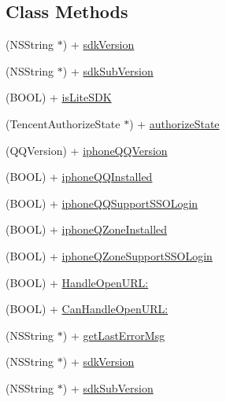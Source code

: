 \subsection*{Class Methods}
\begin{DoxyCompactItemize}
\item 
(N\+S\+String $\ast$) + \mbox{\hyperlink{interface_tencent_o_auth_af681e3d298b7a654741188082dcddf6d}{sdk\+Version}}
\item 
(N\+S\+String $\ast$) + \mbox{\hyperlink{interface_tencent_o_auth_afaf66587ebebdff3de626fb5c77d9d2d}{sdk\+Sub\+Version}}
\item 
(B\+O\+OL) + \mbox{\hyperlink{interface_tencent_o_auth_a47aa5ba73ddbf7181204aa253c3a8bbf}{is\+Lite\+S\+DK}}
\item 
(Tencent\+Authorize\+State $\ast$) + \mbox{\hyperlink{interface_tencent_o_auth_a4498e8023220b1ce078cc9cc764963f1}{authorize\+State}}
\item 
(Q\+Q\+Version) + \mbox{\hyperlink{interface_tencent_o_auth_add8c96fae00aaf2c2a77e4791fb9059d}{iphone\+Q\+Q\+Version}}
\item 
(B\+O\+OL) + \mbox{\hyperlink{interface_tencent_o_auth_a482028f5e63604bf91d216c8586a89b6}{iphone\+Q\+Q\+Installed}}
\item 
(B\+O\+OL) + \mbox{\hyperlink{interface_tencent_o_auth_a7b5a02acedd8dc2b33135cfb863c2828}{iphone\+Q\+Q\+Support\+S\+S\+O\+Login}}
\item 
(B\+O\+OL) + \mbox{\hyperlink{interface_tencent_o_auth_a197f6599acf18b3b36745f4d78614537}{iphone\+Q\+Zone\+Installed}}
\item 
(B\+O\+OL) + \mbox{\hyperlink{interface_tencent_o_auth_a981268c1a6133c1fb6cd378a98de0b5c}{iphone\+Q\+Zone\+Support\+S\+S\+O\+Login}}
\item 
(B\+O\+OL) + \mbox{\hyperlink{interface_tencent_o_auth_a3f72fb9aa1d4848672de15ac3656bf39}{Handle\+Open\+U\+R\+L\+:}}
\item 
(B\+O\+OL) + \mbox{\hyperlink{interface_tencent_o_auth_aab5162f1fbcce989d43da562243de69d}{Can\+Handle\+Open\+U\+R\+L\+:}}
\item 
(N\+S\+String $\ast$) + \mbox{\hyperlink{interface_tencent_o_auth_ada49d962f50bfadf8b3a7eb96420c684}{get\+Last\+Error\+Msg}}
\item 
(N\+S\+String $\ast$) + \mbox{\hyperlink{interface_tencent_o_auth_af681e3d298b7a654741188082dcddf6d}{sdk\+Version}}
\item 
(N\+S\+String $\ast$) + \mbox{\hyperlink{interface_tencent_o_auth_afaf66587ebebdff3de626fb5c77d9d2d}{sdk\+Sub\+Version}}

\end{DoxyCompactItemize}
